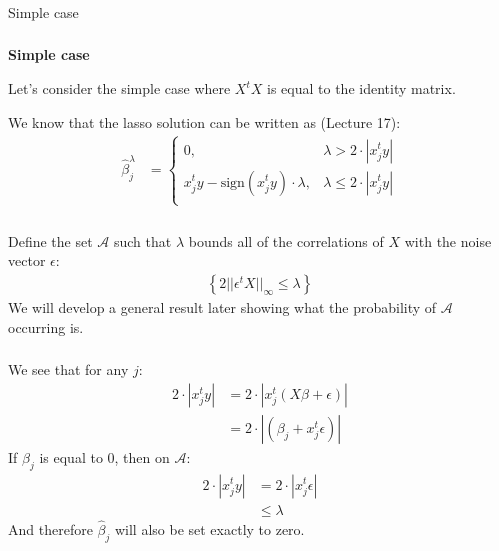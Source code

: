 \begin{frame}[fragile] \frametitle{}

\begin{flushright}
{\color{yaleblue}\sc\fontsize{1cm}{0cm}\selectfont Simple case}
\end{flushright}

\end{frame}

\begin{frame}[fragile] \frametitle{}

\textbf{Simple case}

Let's consider the simple case where $X^t X$ is equal to the identity matrix.

\pause We know that the lasso solution can be written as (Lecture 17):
\begin{align*}
\widehat{\beta}^\lambda_j &= \left\{ \begin{array}{ll}
0, &\lambda > 2 \cdot |x_j^t y| \\[0pt]
x_j^t y - \text{sign}(x_j^t y) \cdot \lambda, &\lambda \leq 2 \cdot|x_j^t y| \\
\end{array} \right.
\end{align*}

\end{frame}

\begin{frame}[fragile] \frametitle{}

Define the set $\mathcal{A}$ such that $\lambda$ bounds
all of the correlations of $X$ with the noise vector $\epsilon$:
\begin{align*}
\left\{ 2 || \epsilon^t X ||_\infty \leq \lambda \right\}
\end{align*}
We will develop a general result later showing what the probability
of $\mathcal{A}$ occurring is.

\end{frame}

\begin{frame}[fragile] \frametitle{}

We see that for any $j$:
\begin{align*}
2 \cdot|x_j^t y| &= 2 \cdot|x_j^t (X \beta + \epsilon) | \\
&= 2 \cdot | (\beta_j + x_j^t \epsilon) |
\end{align*}
\pause If $\beta_j$ is equal to $0$, then on $\mathcal{A}$:
\begin{align*}
2 \cdot|x_j^t y| &= 2 \cdot | x_j^t \epsilon | \\
&\leq \lambda
\end{align*}
And therefore $\widehat{\beta}_j$ will also be set exactly to zero.

\end{frame}

